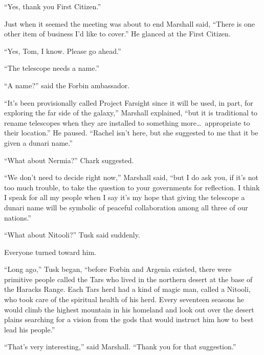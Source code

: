 ``Yes, thank you First Citizen.''

Just when it seemed the meeting was about to end Marshall said, ``There is one other item of
business I'd like to cover.'' He glanced at the First Citizen.

``Yes, Tom, I know. Please go ahead.''

``The telescope needs a name.''

``A name?'' said the Forbin ambassador.

``It's been provisionally called Project Farsight since it will be used, in part, for exploring
the far side of the galaxy,'' Marshall explained, ``but it is traditional to rename telescopes
when they are installed to something more\ldots\ appropriate to their location.'' He paused.
``Rachel isn't here, but she suggested to me that it be given a dunari name.''

``What about Nermia?'' Chark suggested.

``We don't need to decide right now,'' Marshall said, ``but I do ask you, if it's not too much
trouble, to take the question to your governments for reflection. I think I speak for all my
people when I say it's my hope that giving the telescope a dunari name will be symbolic of
peaceful collaboration among all three of our nations.''

``What about Nitooli?'' Tusk said suddenly.

Everyone turned toward him.

``Long ago,'' Tusk began, ``before Forbin and Argenia existed, there were primitive people
called the Tars who lived in the northern desert at the base of the Haracks Range. Each Tars
herd had a kind of magic man, called a Nitooli, who took care of the spiritual health of his
herd. Every seventeen seasons he would climb the highest mountain in his homeland and look out
over the desert plains searching for a vision from the gods that would instruct him how to best
lead his people.''

``That's very interesting,'' said Marshall. ``Thank you for that suggestion.''

